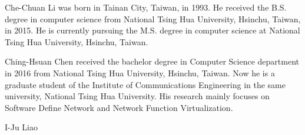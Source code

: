 \documentclass[journal]{IEEEtran}
\begin{document}
\begin{IEEEbiography}
{Che-Chuan Li} was born in Tainan City, Taiwan, in 1993. He received the B.S. degree in computer science from National Tsing Hua University, Hsinchu, Taiwan, in 2015. He is currently pursuing the M.S. degree in computer science at National Tsing Hua University, Hsinchu, Taiwan.
\end{IEEEbiography}

\begin{IEEEbiography}
{Ching-Hsuan Chen} received the bachelor degree in Computer Science department in 2016 from National Tsing Hua University, Hsinchu, Taiwan. Now he is a graduate student of the Institute of Communications Engineering in the same university, National Tsing Hua University. His research mainly focuses on Software Define Network and Network Function Virtualization.
\end{IEEEbiography}

\begin{IEEEbiography}
{I-Ju Liao}
\end{IEEEbiography}
\end{document}
